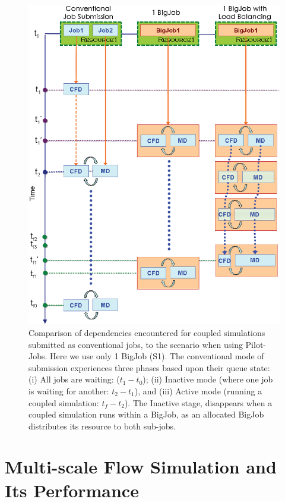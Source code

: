 \documentclass[conference,final]{IEEEtran}
\begin{document}
\begin{figure}
\centering
\includegraphics[scale=0.4]{Simulation_Time_of_One_BigJob.eps}
\caption{\small Comparison of dependencies encountered for coupled
  simulations submitted as conventional jobs, to the scenario when
  using Pilot-Jobs. Here we use only 1 BigJob (S1). The conventional
  mode of submission experiences three phases based upon their queue
  state: (i) All jobs are waiting: ($t_1-t_0$); (ii) Inactive mode
  (where one job is waiting for another: $t_2-t_1$), and (iii) Active
  mode (running a coupled simulation: $t_f-t_2$). The Inactive stage,
  disappears when a coupled simulation runs within a BigJob, as an
  allocated BigJob distributes its resource to both sub-jobs.}
\label{Fig:OneBJ_Flow}
\vspace{-1em}
\end{figure}



\section{Multi-scale Flow Simulation and Its Performance}
\end{document}
